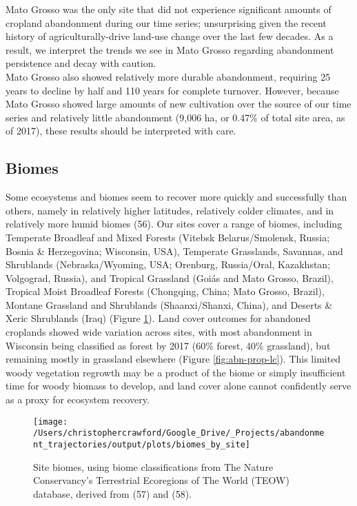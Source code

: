 \documentclass[9pt,twocolumn,twoside,]{pnas-new}
\begin{document}
Mato Grosso was the only site that did not experience significant amounts of cropland abandonment during our time series; unsurprising given the recent history of agriculturally-drive land-use change over the last few decades.
As a result, we interpret the trends we see in Mato Grosso regarding abandonment persistence and decay with caution.\\
Mato Grosso also showed relatively more durable abandonment, requiring 25 years to decline by half and 110 years for complete turnover.
However, because Mato Grosso showed large amounts of new cultivation over the source of our time series and relatively little abandonment (9,006 ha, or 0.47\% of total site area, as of 2017), these results should be interpreted with care.

\hypertarget{biomes}{%
\subsection{Biomes}\label{biomes}}

Some ecosystems and biomes seem to recover more quickly and successfully than others, namely in relatively higher latitudes, relatively colder climates, and in relatively more humid biomes (56).
Our sites cover a range of biomes, including Temperate Broadleaf and Mixed Forests (Vitebsk Belarus/Smolensk, Russia; Bosnia \& Herzegovina; Wisconsin, USA), Temperate Grasslands, Savannas, and Shrublands (Nebraska/Wyoming, USA; Orenburg, Russia/Oral, Kazakhstan; Volgograd, Russia), and Tropical Grassland (Goiás and Mato Grosso, Brazil), Tropical Moist Broadleaf Forests (Chongqing, China; Mato Grosso, Brazil), Montane Grassland and Shrublands (Shaanxi/Shanxi, China), and Deserts \& Xeric Shrublands (Iraq) (Figure \ref{fig:site-biomes}).
Land cover outcomes for abandoned croplands showed wide variation across sites, with most abandonment in Wisconsin being classified as forest by 2017 (60\% forest, 40\% grassland), but remaining mostly in grassland elsewhere (Figure \ref{fig:abn-prop-lc}).
This limited woody vegetation regrowth may be a product of the biome or simply insufficient time for woody biomass to develop, and land cover alone cannot confidently serve as a proxy for ecosystem recovery.



\begin{figure}
\texttt{[image: /Users/christophercrawford/Google\_Drive/\_Projects/abandonment\_trajectories/output/plots/biomes\_by\_site]} \caption{Site biomes, using biome classifications from The Nature Conservancy's Terrestrial Ecoregions of The World (TEOW) database, derived from (57) and (58).}\label{fig:site-biomes}
\end{figure}
\end{document}
